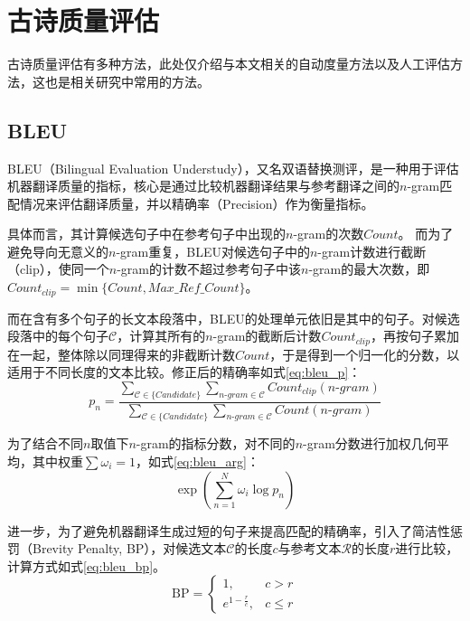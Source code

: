 \section{古诗质量评估}

古诗质量评估有多种方法，此处仅介绍与本文相关的自动度量方法以及人工评估方法，这也是相关研究中常用的方法。

\subsection{BLEU} \label{sec:bleu}
BLEU（Bilingual Evaluation Understudy），又名双语替换测评，是一种用于评估机器翻译质量的指标，核心是通过比较机器翻译结果与参考翻译之间的$n$-gram匹配情况来评估翻译质量，并以精确率（Precision）作为衡量指标。

具体而言，其计算候选句子中在参考句子中出现的$n$-gram的次数$Count$。
而为了避免导向无意义的$n$-gram重复，BLEU对候选句子中的$n$-gram计数进行截断（clip），使同一个$n$-gram的计数不超过参考句子中该$n$-gram的最大次数，即$Count_{clip}=\min\{Count,Max\_Ref\_Count\}$。

而在含有多个句子的长文本段落中，BLEU的处理单元依旧是其中的句子。对候选段落中的每个句子$\mathcal C$，计算其所有的$n$-gram的截断后计数$Count_{clip}$，再按句子累加在一起，整体除以同理得来的非截断计数$Count$，于是得到一个归一化的分数，以适用于不同长度的文本比较。修正后的精确率如式\eqref{eq:bleu_p}：
\begin{equation}
    p_n=\frac{\sum_{\mathcal C \in\{Candidate\}} \sum_{n\mbox{-}gram\in\mathcal C} Count_{clip}(n\mbox{-}gram)}{\sum_{\mathcal C \in\{Candidate\}} \sum_{n\mbox{-}gram\in\mathcal C} Count(n\mbox{-}gram)} \label{eq:bleu_p}
\end{equation}

为了结合不同$n$取值下$n$-gram的指标分数，对不同的$n$-gram分数进行加权几何平均，其中权重$\sum\omega_i=1$，如式\eqref{eq:bleu_arg}：
\begin{equation}
    \exp\left(\sum^N_{n=1} \omega_i\log p_n\right) \label{eq:bleu_arg}
\end{equation}

进一步，为了避免机器翻译生成过短的句子来提高匹配的精确率，引入了简洁性惩罚（Brevity Penalty, BP），对候选文本$\mathcal C$的长度$c$与参考文本$\mathcal R$的长度$r$进行比较，计算方式如式\eqref{eq:bleu_bp}。
\begin{equation}
    \mathrm{BP}=\left\{
    \begin{array}{lr}
        1, &c>r \\
        e^{1-\frac rc}, & c\leq r
    \end{array}
    \right. 
    \label{eq:bleu_bp}
\end{equation}

